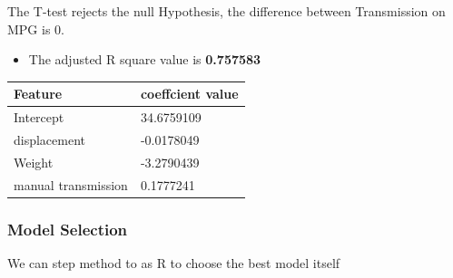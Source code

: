 \documentclass[
]{article}
\newenvironment{Shaded}{\begin{snugshade}}{\end{snugshade}}
\newcommand{\DataTypeTok}[1]{\textcolor[rgb]{0.13,0.29,0.53}{#1}}
\newcommand{\DecValTok}[1]{\textcolor[rgb]{0.00,0.00,0.81}{#1}}
\newcommand{\KeywordTok}[1]{\textcolor[rgb]{0.13,0.29,0.53}{\textbf{#1}}}
\newcommand{\NormalTok}[1]{#1}
\newcommand{\OperatorTok}[1]{\textcolor[rgb]{0.81,0.36,0.00}{\textbf{#1}}}
\newcommand{\StringTok}[1]{\textcolor[rgb]{0.31,0.60,0.02}{#1}}
\providecommand{\tightlist}{%
  \setlength{\itemsep}{0pt}\setlength{\parskip}{0pt}}
\begin{document}
The T-test rejects the null Hypothesis, the difference between
Transmission on MPG is 0.

\begin{Shaded}
\end{Shaded}

\begin{itemize}
\tightlist
\item
  The adjusted R square value is \textbf{0.757583}
\end{itemize}

\begin{longtable}[]{@{}ll@{}}
\toprule
Feature & coeffcient value\tabularnewline
\midrule
\endhead
Intercept & 34.6759109\tabularnewline
displacement & -0.0178049\tabularnewline
Weight & -3.2790439\tabularnewline
manual transmission & 0.1777241\tabularnewline
\bottomrule
\end{longtable}

\hypertarget{model-selection}{%
\subsubsection{Model Selection}\label{model-selection}}

We can step method to as R to choose the best model itself

\begin{Shaded}
\end{Shaded}
\end{document}
